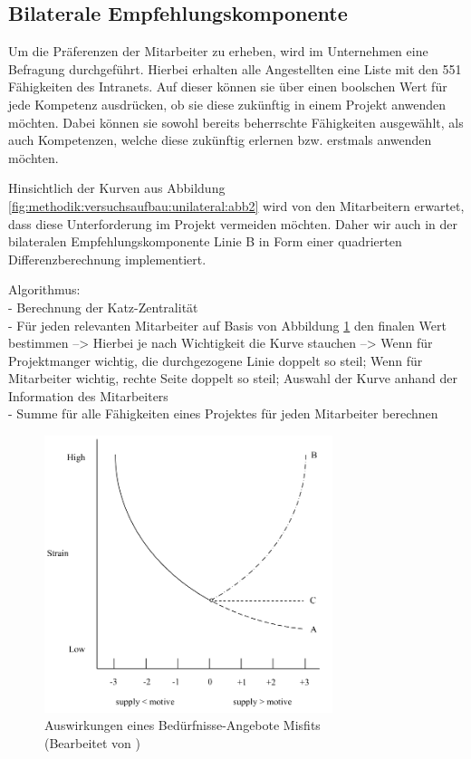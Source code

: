 \subsection{Bilaterale Empfehlungskomponente}
\label{ch:methodik:versuchsaufbau:bilateral}
Um die Präferenzen der Mitarbeiter zu erheben, wird im Unternehmen eine Befragung durchgeführt. Hierbei erhalten alle Angestellten eine Liste mit den 551 Fähigkeiten des Intranets. Auf dieser können sie über einen boolschen Wert für jede Kompetenz ausdrücken, ob sie diese zukünftig in einem Projekt anwenden möchten. Dabei können sie sowohl bereits beherrschte Fähigkeiten ausgewählt, als auch Kompetenzen, welche diese zukünftig erlernen bzw. erstmals anwenden möchten.

Hinsichtlich der Kurven aus Abbildung \ref{fig:methodik:versuchsaufbau:unilateral:abb2} wird von den Mitarbeitern erwartet, dass diese Unterforderung im Projekt vermeiden möchten. Daher wir auch in der bilateralen Empfehlungskomponente Linie B in Form einer quadrierten Differenzberechnung implementiert.

\newpage
Algorithmus:\\
- Berechnung der Katz-Zentralität\\
- Für jeden relevanten Mitarbeiter auf Basis von Abbildung \ref{fig:methodik:abb2} den finalen Wert bestimmen --> Hierbei je nach Wichtigkeit die Kurve stauchen --> Wenn für Projektmanger wichtig, die durchgezogene Linie doppelt so steil; Wenn für Mitarbeiter wichtig, rechte Seite doppelt so steil; Auswahl der Kurve anhand der Information des Mitarbeiters\\
- Summe für alle Fähigkeiten eines Projektes für jeden Mitarbeiter berechnen

\begin{figure}[h]
	\centering
	\includegraphics[width=0.75\textwidth]{gfx/ueberschuss_supply_motive.png}
	\caption{Auswirkungen eines Bedürfnisse-Angebote Misfits \cite[S. 23]{edwards:2008}\\(Bearbeitet von \myName)}
	\label{fig:methodik:abb2}
\end{figure}

